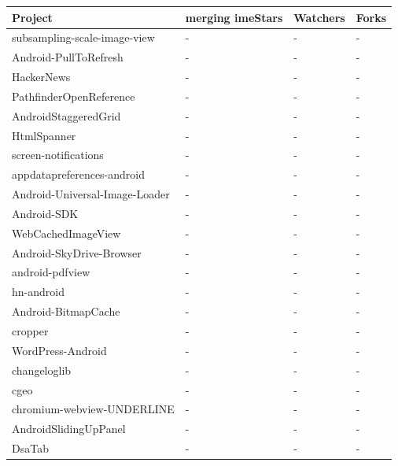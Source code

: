 \documentclass[conference]{IEEEtran}
\begin{document}





\begin{table}
\centering
\begin{tabular}{llll}
    \hline
    \bfseries{Project} & \bfseries{merging imeStars} & \bfseries{Watchers} & \bfseries{Forks} \\
    \hline
subsampling-scale-image-view  &  -  &  -    & - \\
Android-PullToRefresh &  -  &  -    & - \\
HackerNews &  -  &  -    & - \\
PathfinderOpenReference  &  -  &  -    & - \\
AndroidStaggeredGrid  &  -  &  -    & - \\
HtmlSpanner  &  -  &  -    & - \\
screen-notifications  &  -  &  -    & - \\
appdatapreferences-android  &  -  &  -    & - \\
Android-Universal-Image-Loader  &  -  &  -    & - \\
Android-SDK  &  -  &  -    & - \\
WebCachedImageView  &  -  &  -    & - \\
Android-SkyDrive-Browser  &  -  &  -    & - \\
android-pdfview  &  -  &  -    & - \\
hn-android  &  -  &  -    & - \\
Android-BitmapCache  &  -  &  -    & - \\
cropper  &  -  &  -    & - \\
WordPress-Android  &  -  &  -    & - \\
changeloglib  &  -  &  -    & - \\
cgeo  &  -  &  -    & - \\
chromium-webview-UNDERLINE  &  -  &  -    & - \\
AndroidSlidingUpPanel  &  -  &  -    & - \\
DsaTab  &  -  &  -    & - \\

\end{tabular}
\end{table}
\end{document}
